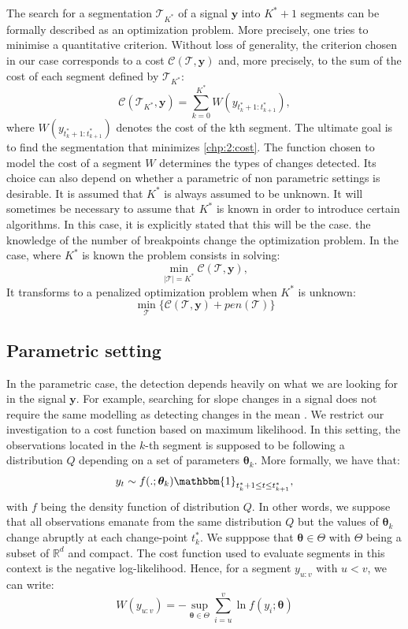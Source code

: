 The search for a segmentation $\mathcal{T}_{K^*}$  of a signal $\bm y$ into $K^*+1$ segments can be formally described as an optimization problem. More precisely, one tries to minimise a quantitative criterion. Without loss of generality, the criterion chosen in our case corresponds to a cost $\mathcal{C}(\mathcal{T},\bm y)$ and, more precisely, to the sum of the cost of each segment defined by $\mathcal{T}_{K^*}$: 
\begin{equation}\label{chp:2:cost}
\mathcal{C}(\mathcal{T}_{K^*},\bm y) = \sum_{k=0}^{K^*} W(y_{t^*_k+1:t^*_{k+1}}),
\end{equation}
where $W(y_{t^*_k+1:t^*_{k+1}})$ denotes the cost of the kth segment. The ultimate goal is to find the segmentation that minimizes \ref{chp:2:cost}. The function chosen to model the cost of a segment $W$ determines the types of changes detected. Its choice can also depend on whether a parametric of non parametric settings is desirable. 
It is assumed that $K^*$ is always assumed to be unknown. It will sometimes be necessary to assume that $K^*$ is known in order to introduce certain algorithms. In this case, it is explicitly stated that this will be the case. the knowledge of the number of breakpoints change the optimization problem. In the case, where $K^*$ is known the problem consists in solving: 
\begin{equation}\label{chp:2:optKnown}
\min_{\lvert\mathcal{T}\rvert = K^*} \mathcal{C}(\mathcal{T},\bm y), 
\end{equation}     
It transforms to a penalized optimization problem when $K^*$ is unknown: 
\begin{equation}\label{chp:2:optnKnown}
\min_{\mathcal{T}} \{ \mathcal{C}(\mathcal{T},\bm y) + pen(\mathcal{T}) \} 
\end{equation}      


\subsection{Parametric setting}\label{chp2:sec:likm}

In the parametric case, the detection depends heavily on what we are looking for in the signal $\bm y$. For example, searching for slope changes in a signal \cite{Bai1994,Fearnhead2018} does not require the same modelling as detecting changes in the mean \cite{Frick2014,chen2012parametric}. We restrict our investigation to a cost function based on maximum likelihood. In this setting, the observations located in the $k$-th segment is supposed to be following a distribution $Q$ depending on a set of parameters $\bm \theta_k$. More formally, we have that:
$$y_t \sim f(.;\bm \theta_k)\mathbbm{1}_{t_{k}^*+1\leq t \leq t_{k+1}^*},$$
with $f$ being the density function of distribution $Q$. In other words, we suppose that all observations emanate from the same distribution $Q$ but the values of $\bm \theta_k$ change abruptly at each change-point $t^*_k$. We supppose that $\bm \theta \in \Theta$ with $\Theta$ being a subset of $\mathbb{R}^d$ and compact. 
The cost function used to evaluate segments in this context is the negative log-likelihood. Hence, for a segment $y_{u:v}$ with $u < v$, we can write:  
$$W(y_{u:v}) = -\sup_{\bm \theta \in \Theta} \sum_{i = u}^{v} \ln f(y_i; \bm \theta)$$ 

